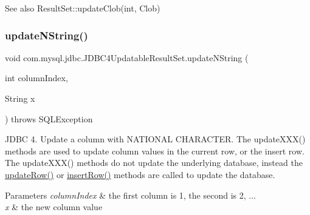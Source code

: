 \begin{DoxySeeAlso}{See also}
Result\+Set\+::update\+Clob(int, Clob) 
\end{DoxySeeAlso}
\mbox{\label{classcom_1_1mysql_1_1jdbc_1_1_j_d_b_c4_updatable_result_set_acbeb1ce191cafe06f0932661770954f6}} 
\subsubsection{\texorpdfstring{update\+N\+String()}{updateNString()}\hspace{0.1cm}{\footnotesize\ttfamily [1/2]}}
{\footnotesize\ttfamily void com.\+mysql.\+jdbc.\+J\+D\+B\+C4\+Updatable\+Result\+Set.\+update\+N\+String (\begin{DoxyParamCaption}\item[{int}]{column\+Index,  }\item[{String}]{x }\end{DoxyParamCaption}) throws S\+Q\+L\+Exception}

J\+D\+BC 4. Update a column with N\+A\+T\+I\+O\+N\+AL C\+H\+A\+R\+A\+C\+T\+ER. The update\+X\+X\+X() methods are used to update column values in the current row, or the insert row. The update\+X\+X\+X() methods do not update the underlying database, instead the \mbox{\hyperlink{classcom_1_1mysql_1_1jdbc_1_1_updatable_result_set_a919969ba4b3c7cbc7b18605e9f31a746}{update\+Row()}} or \mbox{\hyperlink{classcom_1_1mysql_1_1jdbc_1_1_updatable_result_set_aef041f8d9d0778083716fc26652648fa}{insert\+Row()}} methods are called to update the database.


\begin{DoxyParams}{Parameters}
{\em column\+Index} & the first column is 1, the second is 2, ... \\
\hline
{\em x} & the new column value\\
\hline
\end{DoxyParams}


